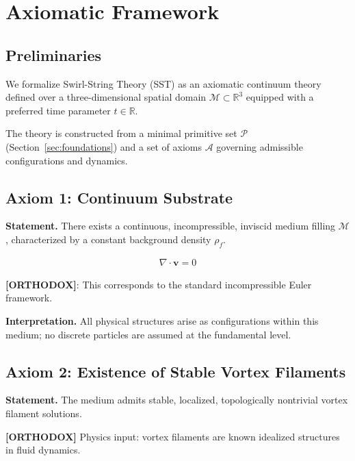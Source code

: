 \documentclass[11pt]{article}
\theoremstyle{definition}
\theoremstyle{plain}
\theoremstyle{remark}
\newcommand{\rhoF}{{\rho_{\!f}}}
\begin{document}
\section{Axiomatic Framework}
    \label{sec:axioms}
    
    \subsection{Preliminaries}
        
        We formalize Swirl-String Theory (SST) as an axiomatic continuum theory defined over a three-dimensional spatial domain $\mathcal{M} \subset \mathbb{R}^3$ equipped with a preferred time parameter $t \in \mathbb{R}$.
        
        The theory is constructed from a minimal primitive set $\mathcal{P}$ (Section~\ref{sec:foundations}) and a set of axioms $\mathcal{A}$ governing admissible configurations and dynamics.
    
    \subsection{Axiom 1: Continuum Substrate}
        
        \textbf{Statement.}
        There exists a continuous, incompressible, inviscid medium filling $\mathcal{M}$, characterized by a constant background density $\rhoF$.
        
        \begin{align}
            \nabla \cdot \mathbf{v} = 0
        \end{align}
        
        \textbf{[ORTHODOX]}: This corresponds to the standard incompressible Euler framework.
        
        \textbf{Interpretation.}
        All physical structures arise as configurations within this medium; no discrete particles are assumed at the fundamental level.
    
    \subsection{Axiom 2: Existence of Stable Vortex Filaments}
        
        \textbf{Statement.}
        The medium admits stable, localized, topologically nontrivial vortex filament solutions.
        
        \textbf{[ORTHODOX]} Physics input: vortex filaments are known idealized structures in fluid dynamics.
\end{document}
